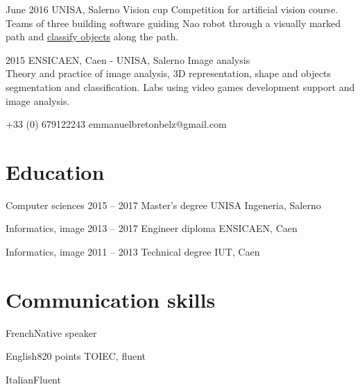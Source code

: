 \documentclass{tccv-master/tccv}
\begin{document}
\begin{eventlist}
\item{June 2016}
{UNISA, Salerno}
     {Vision cup}
Competition for artificial vision course. Teams of three building software guiding 
Nao robot through a visually marked path and \href{https://github.com/manumanmax/Nao}{classify objects} along the path.

\item{2015}
{ENSICAEN, Caen - UNISA, Salerno}
     {Image analysis} \\
Theory and practice of image analysis, 3D representation, shape and objects segmentation and classification.
Labs using video games development support and image analysis. 

\end{eventlist}
    {+33 (0) 679122243}
    {emmanuelbretonbelz@gmail.com}

\section{Education}

\begin{yearlist}

\item[Computer sciences]{2015 -- 2017}
     {Master's degree}
     {UNISA Ingeneria, Salerno}

\item[Informatics, image]{2013 -- 2017}
     {Engineer diploma}
     {ENSICAEN, Caen}

\item[Informatics, image]{2011 -- 2013}
     {Technical degree}
     {IUT, Caen}

\end{yearlist}

\section{Communication skills}

\begin{factlist}
\item{French}{Native speaker}
\item{English}{820 points TOIEC, fluent}
\item{Italian}{Fluent}
\end{factlist}
\end{document}

